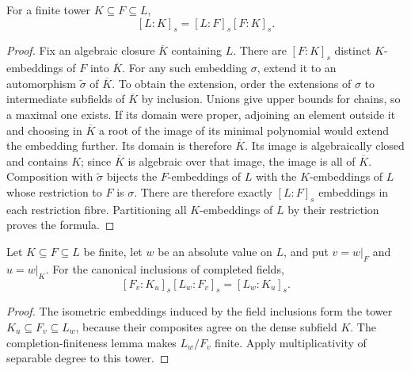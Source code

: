 \begin{lemma}
\label{lem:separable-degree-tower}
\mathlibok
{}
For a finite tower $K\subseteq F\subseteq L$,
\[
 [L:K]_s=[L:F]_s[F:K]_s.
\]
\end{lemma}
\begin{proof}
Fix an algebraic closure $\overline K$ containing $L$. There are
$[F:K]_s$ distinct $K$-embeddings of $F$ into $\overline K$.
For any such embedding $\sigma$, extend it to an automorphism
$\widetilde\sigma$ of $\overline K$. To obtain the extension, order
the extensions of $\sigma$ to intermediate subfields of $\overline K$
by inclusion. Unions give upper bounds for chains, so a maximal one
exists. If its domain were proper, adjoining an element outside it
and choosing in $\overline K$ a root of the image of its minimal
polynomial would extend the embedding further. Its domain is therefore
$\overline K$. Its image is algebraically closed and contains $K$;
since $\overline K$ is algebraic over that image, the image is all of
$\overline K$. Composition with
$\widetilde\sigma$ bijects the $F$-embeddings of $L$ with the
$K$-embeddings of $L$ whose restriction to $F$ is $\sigma$.
There are therefore exactly $[L:F]_s$ embeddings in each restriction
fibre. Partitioning all $K$-embeddings of $L$ by their restriction
proves the formula.
\end{proof}


\begin{lemma}
\label{lem:local-separable-degree-tower}
\leanok
{}
Let $K\subseteq F\subseteq L$ be finite, let $w$ be an absolute value
on $L$, and put $v=w|_F$ and $u=w|_K$. For the canonical inclusions
of completed fields,
\[
 [F_v:K_u]_s[L_w:F_v]_s=[L_w:K_u]_s.
\]
\end{lemma}
\begin{proof}
The isometric embeddings induced by the field inclusions form the
tower $K_u\subseteq F_v\subseteq L_w$, because their composites agree
on the dense subfield $K$. The completion-finiteness lemma makes
$L_w/F_v$ finite. Apply multiplicativity of separable degree to this
tower.
\end{proof}

